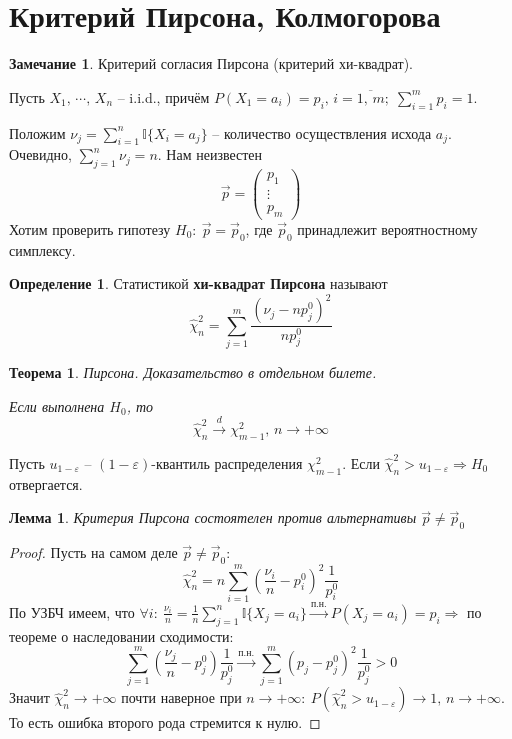 \documentclass[a4paper,12pt]{article}
\theoremstyle{plain}
\newtheorem{theorem}{Теорема}[section]
\newtheorem{lemma}{Лемма}[section]
\theoremstyle{definition}
\newtheorem{definition}{Определение}[section]
\newtheorem*{note}{Замечание}
\theoremstyle{remark}
\begin{document}
\section{Критерий Пирсона, Колмогорова}
\begin{note}
  Критерий согласия Пирсона (критерий хи-квадрат).

  Пусть $X_1,\,\cdots,\,X_n$ -- i.i.d., причём $P(X_1 = a_i) = p_i,\, i =\overline{1,\,m};\; \sum_{i = 1}^m p_i = 1$.

  Положим $\nu_j = \sum_{i = 1}^n \mathbb{I}\{X_i = a_j\}$ -- количество осуществления исхода $a_j$. Очевидно, $\sum_{j = 1}^n \nu_j = n$. Нам неизвестен
  \[
    \vec{p} = \begin{pmatrix}
      p_1\\
      \vdots\\
      p_m
    \end{pmatrix}
  \]
  Хотим проверить гипотезу $H_0 :\: \vec{p} = \vec{p}_0$, где $\vec{p}_0$ принадлежит вероятностному симплексу.
\end{note}

\begin{definition}
  Статистикой \textbf{хи-квадрат Пирсона} называют
  \[
    \hat{\chi}^2_n = \sum_{j = 1}^m\frac{(\nu_j - np_j^0)^2}{np_j^0}
  \]
\end{definition}

\begin{theorem}
  Пирсона. Доказательство в отдельном билете.

  Если выполнена $H_0$, то 
  \[
    \hat{\chi}^2_n \overset{d}{\to} \chi^2_{m - 1},\, n \to +\infty
  \]
\end{theorem}

Пусть $u_{1 - \varepsilon}$ -- $(1 - \varepsilon)$-квантиль распределения $\chi^2_{m - 1}$. Если $\hat{\chi}^2_{n} > u_{1 - \varepsilon} \Rightarrow H_0$ отвергается.

\begin{lemma}
  Критерия Пирсона состоятелен против альтернативы $\vec{p} \neq \vec{p}_0$
\end{lemma}

\begin{proof}
  Пусть на самом деле $\vec{p} \neq \vec{p}_0$:
  \[
    \hat{\chi}^2_n = n\sum_{i = 1}^m\left(\frac{\nu_i}{n} - p_i^0\right)^2\frac{1}{p_i^0}
  \]
  По УЗБЧ имеем, что $\forall i :\: \frac{\nu_i}{n} = \frac{1}{n}\sum_{j = 1}^n\mathbb{I}\{X_j = a_i\} \overset{\text{п.н.}}{\to} P(X_j = a_i) = p_i \Rightarrow$ по теореме о наследовании сходимости:
  \[
    \sum_{j = 1}^m\left(\frac{\nu_j}{n} - p_j^0\right)\frac{1}{p_j^0} \overset{\text{п.н.}}{\to} \sum_{j = 1}^m(p_j - p_j^0)^2\frac{1}{p_j^0} > 0
  \]
  Значит $\hat{\chi}^2_n \to +\infty$ почти наверное при $n \to +\infty :\: P(\hat{\chi}^2_n > u_{1 - \varepsilon}) \to 1,\, n \to +\infty$. То есть ошибка второго рода стремится к нулю.
\end{proof}
\end{document}
